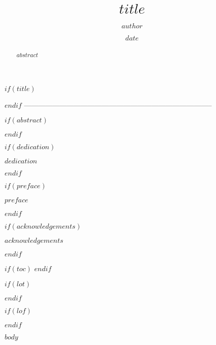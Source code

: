 \documentclass[12pt, twoside]{UOAthesis} %
\title{$title$}             %
\author{$author$}           %
\date{$date$}               %
\begin{document}

$if(title)$
  \maketitle
$endif$
--------------------------------------------------------------------------------

\frontmatter %

$if(abstract)$
  \begin{abstract}
    $abstract$
  \end{abstract}
$endif$

$if(dedication)$
  \begin{dedication}
    $dedication$
  \end{dedication}
$endif$

$if(preface)$
  \begin{preface}
    $preface$
  \end{preface}
$endif$

$if(acknowledgements)$
  \begin{acknowledgements}
    $acknowledgements$
  \end{acknowledgements}
$endif$

$if(toc)$
  \hypersetup{linkcolor=$if(toccolor)$$toccolor$$else$black$endif$}
  \setcounter{secnumdepth}{$toc-depth$}
  \setcounter{tocdepth}{$toc-depth$}
  \tableofcontents
$endif$

$if(lot)$
  \listoftables
$endif$

$if(lof)$
  \listoffigures
$endif$


\mainmatter %
\pagestyle{fancyplain} %

$body$


\end{document}
